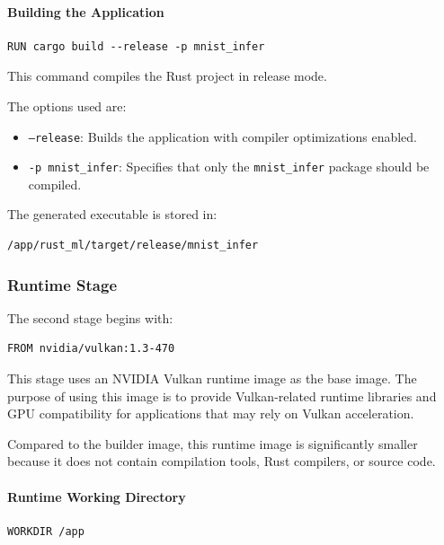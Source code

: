 \documentclass[10pt,a4paper,twocolumn]{article}
\begin{document}
\paragraph{Building the Application}

\begin{verbatim}
RUN cargo build --release -p mnist_infer
\end{verbatim}

This command compiles the Rust project in release mode.

The options used are:

\begin{itemize}
    \item \texttt{--release}: Builds the application with compiler optimizations enabled.
    \item \texttt{-p mnist\_infer}: Specifies that only the \texttt{mnist\_infer} package should be compiled.
\end{itemize}

The generated executable is stored in:

\begin{verbatim}
/app/rust_ml/target/release/mnist_infer
\end{verbatim}

\subsubsection{Runtime Stage}

The second stage begins with:

\begin{verbatim}
FROM nvidia/vulkan:1.3-470
\end{verbatim}

This stage uses an NVIDIA Vulkan runtime image as the base image. The purpose of using this image is to provide Vulkan-related runtime libraries and GPU compatibility for applications that may rely on Vulkan acceleration.

Compared to the builder image, this runtime image is significantly smaller because it does not contain compilation tools, Rust compilers, or source code.


\paragraph{Runtime Working Directory}

\begin{verbatim}
WORKDIR /app
\end{verbatim}
\end{document}
